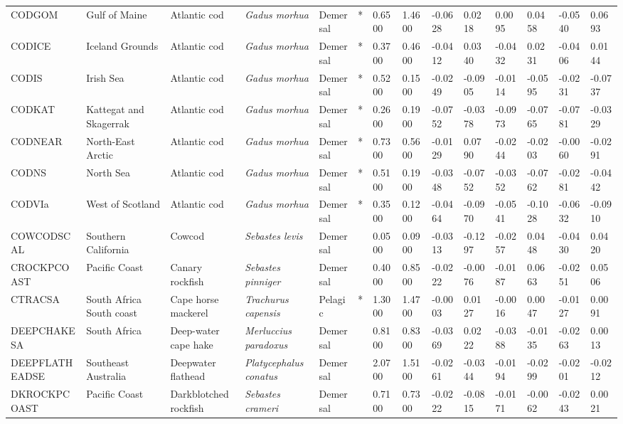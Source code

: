 \begin{longtable}{p{2.8cm}p{2cm}p{1.7cm}p{1.7cm}p{1cm}p{0.3cm}p{1cm}p{1cm}p{1cm}p{1cm}p{1cm}p{1cm}p{1cm}p{1cm}}
  CODGOM & Gulf of Maine & Atlantic cod & \textit{Gadus morhua} & Demersal & * & 0.6500 & 1.4600 & -0.0628 & 0.0218 & 0.0095 & 0.0458 & -0.0540 & 0.0693 \\ 
  CODICE & Iceland Grounds & Atlantic cod & \textit{Gadus morhua} & Demersal & * & 0.3700 & 0.4600 & -0.0412 & 0.0340 & -0.0432 & 0.0231 & -0.0406 & 0.0144 \\ 
  CODIS & Irish Sea & Atlantic cod & \textit{Gadus morhua} & Demersal & * & 0.5200 & 0.1500 & -0.0249 & -0.0905 & -0.0114 & -0.0595 & -0.0231 & -0.0737 \\ 
  CODKAT & Kattegat and Skagerrak & Atlantic cod & \textit{Gadus morhua} & Demersal & * & 0.2600 & 0.1900 & -0.0752 & -0.0378 & -0.0973 & -0.0765 & -0.0781 & -0.0329 \\ 
  CODNEAR & North-East Arctic & Atlantic cod & \textit{Gadus morhua} & Demersal & * & 0.7300 & 0.5600 & -0.0129 & 0.0790 & -0.0244 & -0.0203 & -0.0060 & -0.0291 \\ 
  CODNS & North Sea & Atlantic cod & \textit{Gadus morhua} & Demersal & * & 0.5100 & 0.1900 & -0.0348 & -0.0752 & -0.0352 & -0.0762 & -0.0281 & -0.0442 \\ 
  CODVIa & West of Scotland & Atlantic cod & \textit{Gadus morhua} & Demersal & * & 0.3500 & 0.1200 & -0.0464 & -0.0970 & -0.0541 & -0.1028 & -0.0632 & -0.0910 \\ 
  COWCODSCAL & Southern California & Cowcod & \textit{Sebastes levis} & Demersal &   & 0.0500 & 0.0900 & -0.0313 & -0.1297 & -0.0257 & 0.0448 & -0.0430 & 0.0420 \\ 
  CROCKPCOAST & Pacific Coast & Canary rockfish & \textit{Sebastes pinniger} & Demersal &   & 0.4000 & 0.8500 & -0.0222 & -0.0076 & -0.0187 & 0.0663 & -0.0251 & 0.0506 \\ 
  CTRACSA & South Africa South coast & Cape horse mackerel & \textit{Trachurus capensis} & Pelagic & * & 1.3000 & 1.4700 & -0.0003 & 0.0127 & -0.0016 & 0.0047 & -0.0127 & 0.0091 \\ 
  DEEPCHAKESA & South Africa & Deep-water cape hake & \textit{Merluccius paradoxus} & Demersal &   & 0.8100 & 0.8300 & -0.0369 & 0.0222 & -0.0388 & -0.0135 & -0.0263 & 0.0013 \\ 
  DEEPFLATHEADSE & Southeast Australia & Deepwater flathead & \textit{Platycephalus conatus} & Demersal &   & 2.0700 & 1.5100 & -0.0261 & -0.0344 & -0.0194 & -0.0299 & -0.0201 & -0.0212 \\ 
  DKROCKPCOAST & Pacific Coast & Darkblotched rockfish & \textit{Sebastes crameri} & Demersal &   & 0.7100 & 0.7300 & -0.0222 & -0.0815 & -0.0171 & -0.0062 & -0.0243 & 0.0021 \\ 

\end{longtable}
